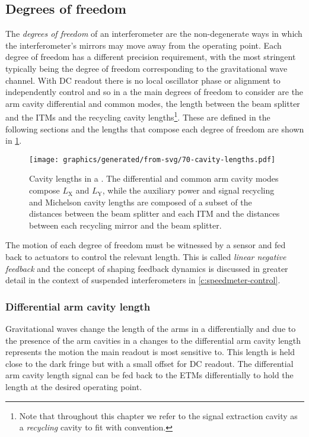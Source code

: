\subsection{\label{sec:dofs-of-drfpmi}Degrees of freedom}
The \emph{degrees of freedom} of an interferometer are the non-degenerate ways in which the interferometer's mirrors may move away from the operating point. Each degree of freedom has a different precision requirement, with the most stringent typically being the degree of freedom corresponding to the gravitational wave channel. With \gls{DC} readout there is no local oscillator phase or alignment to independently control and so in a \DRFPMI{} the main degrees of freedom to consider are the arm cavity differential and common modes, the length between the beam splitter and the \glspl{ITM} and the recycling cavity lengths\footnote{Note that throughout this chapter we refer to the signal extraction cavity as a \emph{recycling} cavity to fit with convention.}. These are defined in the following sections and the lengths that compose each degree of freedom are shown in \cref{fig:et-lf-cavity-lengths}.

\begin{figure}
  \centering
  \texttt{[image: graphics/generated/from-svg/70-cavity-lengths.pdf]}
  \caption[Cavity lengths in a \DRFPMI{}]{\label{fig:et-lf-cavity-lengths}Cavity lengths in a \DRFPMI{}. The differential and common arm cavity modes compose $L_{\text{X}}$ and $L_{\text{Y}}$, while the auxiliary power and signal recycling and Michelson cavity lengths are composed of a subset of the distances between the beam splitter and each \gls{ITM} and the distances between each recycling mirror and the beam splitter.}
\end{figure}

The motion of each degree of freedom must be witnessed by a sensor and fed back to actuators to control the relevant length. This is called \emph{linear negative feedback} and the concept of shaping feedback dynamics is discussed in greater detail in the context of suspended interferometers in \cref{c:speedmeter-control}.

\subsubsection{Differential arm cavity length}
Gravitational waves change the length of the arms in a \MI{} differentially and due to the presence of the arm cavities in a \DRFPMI{} changes to the differential arm cavity length represents the motion the main readout is most sensitive to. This length is held close to the dark fringe but with a small offset for \gls{DC} readout. The differential arm cavity length signal can be fed back to the \glspl{ETM} differentially to hold the length at the desired operating point.

